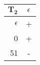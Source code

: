 \begingroup
\scriptsize
\begin{tabular}{r | c}
    $\mathbf{T_2}$ & $\epsilon$ \\ \hline
    $\epsilon$ & + \\ \hline
    0 & + \\
    51 & -
\end{tabular}
\endgroup
